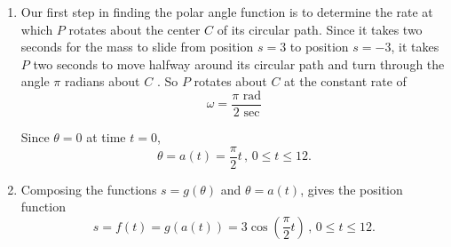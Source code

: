 \documentclass{ximera}
\begin{document}
\begin{example}
\begin{explanation}
\begin{enumerate}
The animation shows the block oscillating along the $s$-axis, plotted vertically. The simple harmonic motion of $M$ is generated by point $P$ moving around the circle of radius $r=3$ meters centered at $s=0$ at a constant speed. 

Since the position function oscillates about its mean of $s=0$ and attains its maximum at time $t=0$, 
\[
 s = g(\theta) = 3\cos\theta \, , \,  0\leq \theta \leq \answer{3\pi}.
\]

\item Our first step in finding the polar angle function is to determine the rate at which $P$ rotates about the center $C$ of its circular path. Since it takes two seconds for the mass to slide from position $s=3$ to position $s=-3$, it takes $P$ two seconds to move halfway around its circular path and turn through the angle $\pi$ radians about $C$ . So $P$ rotates about $C$ at the constant rate of
\[
  \omega = \frac{\pi \text{ rad}}{2 \text{ sec}} %
\]   

Since $\theta=0$ at time $t=0$,
\[
     \theta = a(t) = \frac{\pi}{2}t \, , \, 0\leq t \leq 12.
\]

\item Composing the functions $s=g(\theta)$ and $\theta = a(t)$, gives the position function %
\[
  s = f(t) = g(a(t)) = 3\cos\left( \frac{\pi}{2}t \right) \, , \, 0\leq t \leq 12.
\]

\end{enumerate}
\end{explanation}
\end{example}
\end{document}
